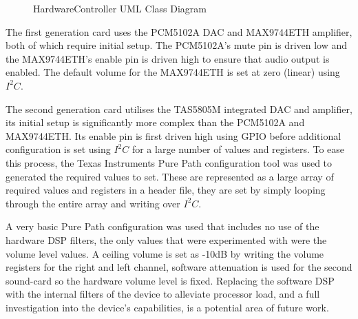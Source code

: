 \documentclass[main.tex]{subfiles}
\begin{document}
\begin{figure}[H]
    \centering
    \caption{HardwareController UML Class Diagram}
    \label{fig:hardware-uml}
\end{figure}

\medskip
The first generation card uses the PCM5102A DAC and MAX9744ETH amplifier, both of which require initial setup.
The PCM5102A's mute pin is driven low and the MAX9744ETH's enable pin is driven high to ensure that audio output is enabled.
The default volume for the MAX9744ETH is set at zero (linear) using $I^2C$.

\medskip
The second generation card utilises the TAS5805M integrated DAC and amplifier, its initial setup is significantly more complex than the PCM5102A and MAX9744ETH.
Its enable pin is first driven high using GPIO before additional configuration is set using $I^2C$ for a large number of values and registers.
To ease this process, the Texas Instruments Pure Path configuration tool was used to generated the required values to set.
These are represented as a large array of required values and registers in a header file, they are set by simply looping through the entire array and writing over $I^2C$.

\medskip
A very basic Pure Path configuration was used that includes no use of the hardware DSP filters, the only values that were experimented with were the volume level values.
A ceiling volume is set as -10dB by writing the volume registers for the right and left channel, software attenuation is used for the second sound-card so the hardware volume level is fixed. 
Replacing the software DSP with the internal filters of the device to alleviate processor load, and a full investigation into the device's capabilities, is a potential area of future work.
\end{document}
